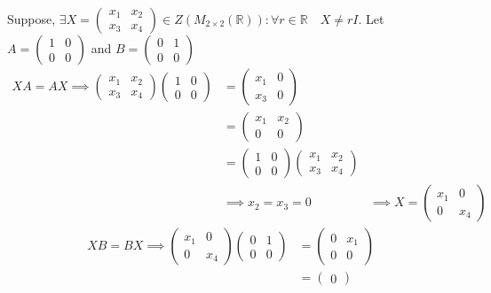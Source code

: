 \documentclass{article}
\newcommand\R{\mathbb{R}}
\begin{document}
\begin{enumerate}
  Suppose, $\exists X=\begin{pmatrix} x_1 & x_2\\x_3 &
    x_4 \end{pmatrix} \in Z\left( M_{2\times 2}(\R) \right): \forall
  r\in \R \quad X\neq
  rI$. Let $A = \begin{pmatrix} 1&0\\0&0\end{pmatrix}$ and $B =\begin{pmatrix} 0&1\\0&0\end{pmatrix}$
  \begin{align*} XA = AX \implies \begin{pmatrix} x_1 & x_2\\x_3 &
      x_4 \end{pmatrix} \begin{pmatrix} 1&0\\0&0\end{pmatrix} &=
  \begin{pmatrix} x_1&0\\x_3&0\end{pmatrix}\\ &= \begin{pmatrix} x_1
    &x_2\\0&0\end{pmatrix}\\ &= \begin{pmatrix} 1&0\\0&0\end{pmatrix} \begin{pmatrix} x_1 & x_2\\x_3 &
      x_4 \end{pmatrix}\\&\implies
    x_2=x_3 = 0&\implies X = \begin{pmatrix}x_1 &0 \\ 0&x_4\end{pmatrix} \end{align*}
  \begin{align*} XB = BX \implies \begin{pmatrix} x_1 & 0\\0 &
      x_4 \end{pmatrix} \begin{pmatrix} 0&1\\0&0\end{pmatrix} &=
  \begin{pmatrix} 0&x_1\\0&0\end{pmatrix}\\ &= \begin{pmatrix} 0

\end{pmatrix}
\end{align*}
\end{enumerate}
\end{document}
